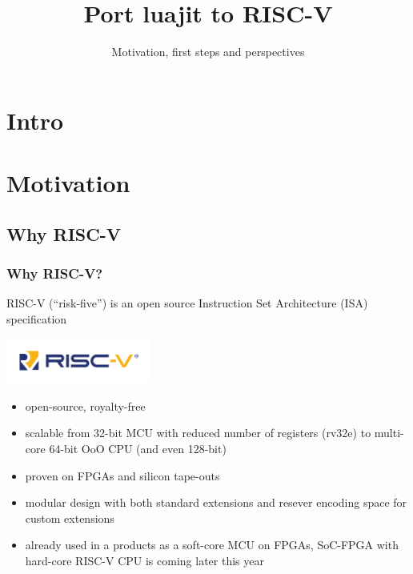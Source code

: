 
\usepackage{tikz}

\title{Port luajit to RISC-V}
\subtitle{Motivation, first steps and perspectives}




\begin{frame}
  \titlepage
\end{frame}

\section{Intro}



\frame{\tableofcontents[subsectionstyle=show]}

\section{Motivation}

\subsection{Why RISC-V}

\begin{frame}
  \frametitle{Why RISC-V?}

  \begin{minipage}{8.5cm}
  RISC-V (“risk-five”) is an open source Instruction Set Architecture
  (ISA) specification
  \end{minipage}

  \vspace{-1.5cm}
  \begin{flushright}
    \includegraphics[height=1.5cm]{riscv-logo-1.png}
  \end{flushright}

  \begin{itemize}
    \item open-source, royalty-free
    \item scalable from 32-bit MCU with reduced number of registers
    (rv32e) to multi-core 64-bit OoO CPU (and even 128-bit)
    \item proven on FPGAs and silicon tape-outs
    \item modular design with both standard extensions and resever
    encoding space for custom extensions
    \item already used in a products as a soft-core MCU on FPGAs,
    SoC-FPGA with hard-core RISC-V CPU is coming later this year
  \end{itemize}
\end{frame}

